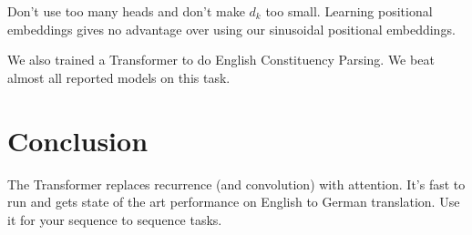 \documentclass[a4paper]{article}
\begin{document}
Don't use too many heads and don't make $d_k$ too small. Learning positional
embeddings gives no advantage over using our sinusoidal positional embeddings.

We also trained a Transformer to do English Constituency Parsing. We beat
almost all reported models on this task.

\section{Conclusion}
The Transformer replaces recurrence (and convolution) with attention. It's
fast to run and gets state of the art performance on English to German
translation. Use it for your sequence to sequence tasks.
\end{document}

